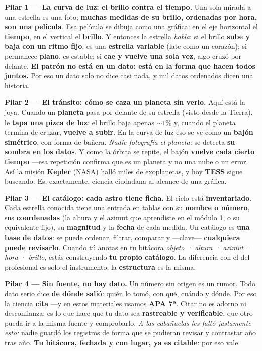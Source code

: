 \documentclass[11pt,letterpaper]{article}
\newcommand{\milcpaso}[3]{%
\Needspace{4\baselineskip}%
\begin{tcolorbox}[enhanced,colback=white,colframe=milcLinea,arc=1.5mm,boxrule=.9pt,
  left=14mm,right=4mm,top=3mm,bottom=3mm,before skip=4pt,after skip=4pt,
  fontupper=\RaggedRight,
  overlay={\node[anchor=north west,circle,fill=#2,text=white,inner sep=0pt,
    minimum size=7.4mm,font=\sffamily\bfseries\small]
    at ([xshift=3.6mm,yshift=-3.2mm]frame.north west) {#1};}]
#3
\end{tcolorbox}}
\begin{document}
\milcpaso{1}{milcTurquesa}{\textbf{Pilar 1 --- La curva de luz: el brillo contra el tiempo.} Una sola mirada a una estrella es una foto; \textbf{muchas medidas de su brillo, ordenadas por hora, son una película}. Esa película se dibuja como una gráfica: en el eje horizontal el \textbf{tiempo}, en el vertical el \textbf{brillo}. Y entonces la estrella \emph{habla}: si el brillo \textbf{sube y baja con un ritmo fijo}, es una \textbf{estrella variable} (late como un corazón); si permanece \textbf{plano}, es estable; si \textbf{cae y vuelve una sola vez}, algo cruzó por delante. \textbf{El patrón no está en un dato: está en la forma que hacen todos juntos.} Por eso un dato solo no dice casi nada, y mil datos ordenados dicen una historia.}
\milcpaso{2}{milcTurquesa}{\textbf{Pilar 2 --- El tránsito: cómo se caza un planeta sin verlo.} Aquí está la joya. Cuando un \textbf{planeta} pasa por delante de su estrella (visto desde la Tierra), le \textbf{tapa una pizca de luz}: el brillo baja apenas $\sim 1\%$ y, cuando el planeta termina de cruzar, \textbf{vuelve a subir}. En la curva de luz eso se ve como un \textbf{bajón simétrico}, con forma de bañera. \emph{Nadie fotografía el planeta:} se detecta \textbf{su sombra en los datos}. Y como la órbita se repite, el bajón \textbf{vuelve cada cierto tiempo} ---esa repetición confirma que es un planeta y no una nube o un error. Así la misión \textbf{Kepler} (NASA) halló miles de exoplanetas, y hoy \textbf{TESS} sigue buscando. Es, exactamente, ciencia ciudadana al alcance de una gráfica.}
\milcpaso{3}{milcTurquesa}{\textbf{Pilar 3 --- El catálogo: cada astro tiene ficha.} El cielo está \textbf{inventariado}. Cada estrella conocida tiene una entrada en tablas con su \textbf{nombre o número}, sus \textbf{coordenadas} (la altura y el azimut que aprendiste en el módulo 1, o su equivalente fijo), su \textbf{magnitud} y la \textbf{fecha} de cada medida. Un catálogo es \textbf{una base de datos}: se puede ordenar, filtrar, comparar y ---clave--- \textbf{cualquiera puede revisarlo}. Cuando tú anotas en tu bitácora \emph{objeto · altura · azimut · hora · brillo}, estás construyendo \textbf{tu propio catálogo}. La diferencia con el del profesional es solo el instrumento; la \textbf{estructura} es la misma.}
\milcpaso{4}{milcTurquesa}{\textbf{Pilar 4 --- Sin fuente, no hay dato.} Un número sin origen es un rumor. Todo dato serio dice \textbf{de dónde salió}: quién lo tomó, con qué, cuándo y dónde. Por eso la ciencia \textbf{cita} ---y en estos materiales usamos \textbf{APA 7ª}. Citar no es adorno ni desconfianza: es lo que hace que tu dato sea \textbf{rastreable y verificable}, que otro pueda ir a la misma fuente y comprobarlo. \emph{A las cabañuelas les faltó justamente esto:} nadie guardó los registros de forma que se pudieran revisar y contrastar año tras año. \textbf{Tu bitácora, fechada y con lugar, ya es citable}: por eso vale.}
\end{document}
